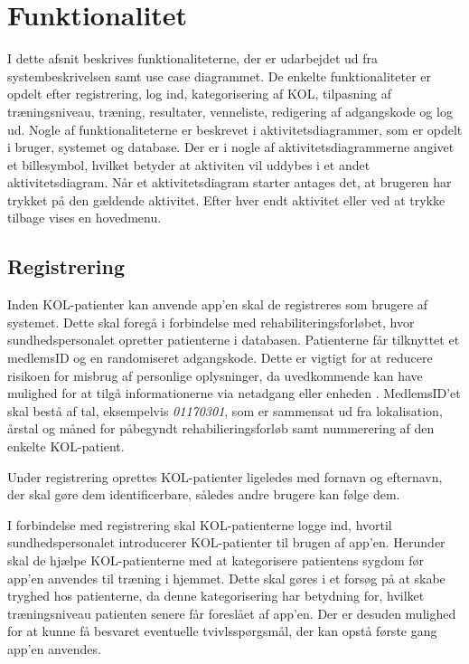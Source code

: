 \section{Funktionalitet}
I dette afsnit beskrives funktionaliteterne, der er udarbejdet ud fra systembeskrivelsen samt use case diagrammet. De enkelte funktionaliteter er opdelt efter registrering, log ind, kategorisering af KOL, tilpasning af træningsniveau, træning, resultater, venneliste, redigering af adgangskode og log ud. Nogle af funktionaliteterne er beskrevet i aktivitetsdiagrammer, som er opdelt i bruger, systemet og database. Der er i nogle af aktivitetsdiagrammerne angivet et billesymbol, hvilket betyder at aktiviten vil uddybes i et andet aktivitetsdiagram. Når et aktivitetsdiagram starter antages det, at brugeren har trykket på den gældende aktivitet. Efter hver endt aktivitet eller ved at trykke tilbage vises en hovedmenu. 

\subsection*{Registrering} \label{sec:registrering}
Inden KOL-patienter kan anvende app'en skal de registreres som brugere af systemet. Dette skal foregå i forbindelse med rehabiliteringsforløbet, hvor sundhedspersonalet opretter patienterne i databasen. Patienterne får tilknyttet et medlemsID og en randomiseret adgangskode. Dette er vigtigt for at reducere risikoen for misbrug af personlige oplysninger, da uvedkommende kan have mulighed for at tilgå informationerne via netadgang eller enheden \cite{Sundhedsdatastyrelsen2016}. MedlemsID'et skal bestå af tal, eksempelvis \textit{01170301}, som er sammensat ud fra lokalisation, årstal og måned for påbegyndt rehabilieringsforløb samt nummerering af den enkelte KOL-patient.

Under registrering oprettes KOL-patienter ligeledes med fornavn og efternavn, der skal gøre dem identificerbare, således andre brugere kan følge dem. 

I forbindelse med registrering skal KOL-patienterne logge ind, hvortil sundhedspersonalet introducerer KOL-patienter til brugen af app'en. Herunder skal de hjælpe KOL-patienterne med at kategorisere patientens sygdom før app'en anvendes til træning i hjemmet. Dette skal gøres i et forsøg på at skabe tryghed hos patienterne, da denne kategorisering har betydning for, hvilket træningsniveau patienten senere får foreslået af app'en. Der er desuden mulighed for at kunne få besvaret eventuelle tvivlsspørgsmål, der kan opstå første gang app'en anvendes. 


